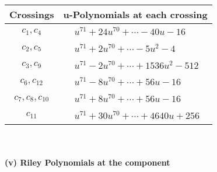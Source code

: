 \documentclass[1p]{elsarticle_modified}
\theoremstyle{definition}
\begin{document}
\begin{tabular}{m{50pt}|m{274pt}}
Crossings & \hspace{64pt}u-Polynomials at each crossing \\
\hline $$\begin{aligned}c_{1},c_{4}\end{aligned}$$&$\begin{aligned}
&u^{71}+24 u^{70}+\cdots-40 u-16
\end{aligned}$\\
\hline $$\begin{aligned}c_{2},c_{5}\end{aligned}$$&$\begin{aligned}
&u^{71}+2 u^{70}+\cdots-5 u^2-4
\end{aligned}$\\
\hline $$\begin{aligned}c_{3},c_{9}\end{aligned}$$&$\begin{aligned}
&u^{71}-2 u^{70}+\cdots+1536 u^2-512
\end{aligned}$\\
\hline $$\begin{aligned}c_{6},c_{12}\end{aligned}$$&$\begin{aligned}
&u^{71}-8 u^{70}+\cdots+56 u-16
\end{aligned}$\\
\hline $$\begin{aligned}c_{7},c_{8},c_{10}\end{aligned}$$&$\begin{aligned}
&u^{71}+8 u^{70}+\cdots+56 u-16
\end{aligned}$\\
\hline $$\begin{aligned}c_{11}\end{aligned}$$&$\begin{aligned}
&u^{71}+30 u^{70}+\cdots+4640 u+256
\end{aligned}$\\
\hline
\end{tabular}\\~\\
\newpage\renewcommand{\arraystretch}{1}
\flushleft \textbf{(v) Riley Polynomials at the component}\newline \\
\end{document}
